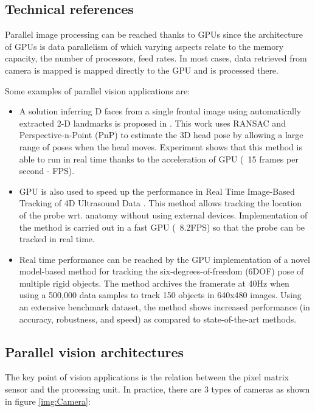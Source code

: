 \documentclass[10pt,a4paper]{article}
\begin{document}
\subsection {Technical references}

Parallel image processing can be reached thanks to GPUs since the architecture of GPUs is data parallelism \cite{Hillis:1986:DPA:7902.7903} of which varying aspects relate to the memory capacity, the number of processors, feed rates. In most cases, data retrieved from camera is mapped is mapped directly to the GPU and is processed there.

Some examples of parallel vision applications are:
\begin{itemize}
\item A solution inferring  D faces from a single frontal image using automatically extracted 2-D landmarks is proposed in \cite{Choi6163031}. This work uses RANSAC \cite{Fischler:1981:RSC:358669.358692} and Perspective-n-Point (PnP) to estimate the 3D head pose by allowing a large range of poses when the head moves. Experiment shows that this method is able to run in real time thanks to the acceleration of GPU (~15 frames per second - FPS).

\item GPU is also used to speed up the performance in Real Time Image-Based Tracking of 4D Ultrasound Data \cite{Oye2012}. This method allows tracking the location of the probe wrt. anatomy without using external devices. Implementation of the method is carried out in a fast GPU (~8.2FPS) so that the probe can be tracked in real time.

\item Real time performance can be reached by the GPU implementation of a novel model-based method for tracking the six-degrees-of-freedom (6DOF) pose of multiple rigid objects. The method archives the framerate at 40Hz when using  a 500,000 data samples to track 150 objects in 640x480 images. Using an extensive benchmark dataset, the method shows increased performance (in accuracy, robustness, and speed) as compared to state-of-the-art methods. 

\end{itemize}

\subsection {Parallel vision architectures}

The key point of vision applications is the relation between the pixel matrix sensor  and the processing unit. In practice, there are 3 types of cameras as shown in figure \ref{img:Camera}:
\end{document}

